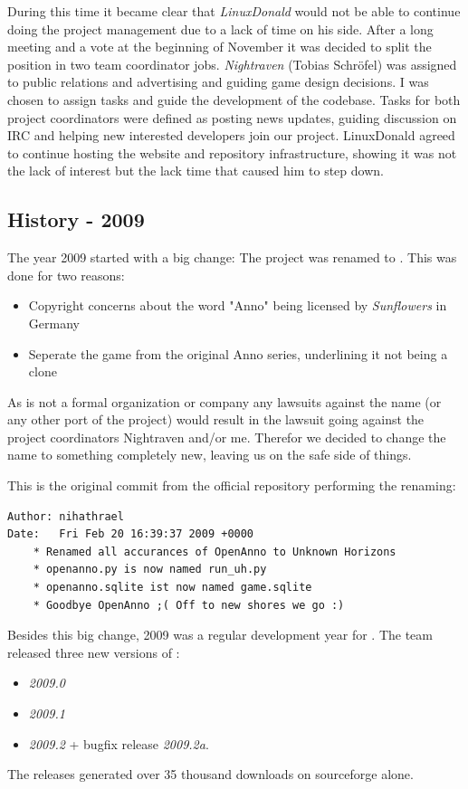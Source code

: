 During this time it became clear that \textit{LinuxDonald} would not be able to continue doing the project management
due to a lack of time on his side. After a long meeting and a vote at the beginning of November it was decided to split the
position in two team coordinator jobs. \textit{Nightraven} (Tobias Schröfel) was assigned to public relations and
advertising and guiding game design decisions. I was chosen to assign tasks and guide the development of the codebase.
Tasks for both project coordinators were defined as posting news updates, guiding discussion on IRC and helping new
interested developers join our project. LinuxDonald agreed to continue hosting the website and repository
infrastructure, showing it was not the lack of interest but the lack time that caused him to step down.

\subsection{History - 2009}
The year 2009 started with a big change: The project was renamed to \UH{}. This was done for two reasons:
\begin{itemize}
    \item Copyright concerns about the word "Anno" being licensed by \textit{Sunflowers} in Germany
    \item Seperate the game from the original Anno series, underlining it not being a clone
\end{itemize}

As \UH{} is not a formal organization or company any lawsuits against the name (or any other port of the project) would
result in the lawsuit going against the project coordinators Nightraven and/or me. Therefor we decided to change the name to
something completely new, leaving us on the safe side of things.

This is the original commit from the official repository performing the renaming:
\begin{lstlisting}[caption=Commit 1831 renaming OpenAnno to Unknown Horizons, label=renamecommit]
Author: nihathrael
Date:   Fri Feb 20 16:39:37 2009 +0000
    * Renamed all accurances of OpenAnno to Unknown Horizons
    * openanno.py is now named run_uh.py
    * openanno.sqlite ist now named game.sqlite
    * Goodbye OpenAnno ;( Off to new shores we go :)
\end{lstlisting}

Besides this big change, 2009 was a regular development year for \UH{}. The team released three new versions of \UH{}:
\begin{itemize}
\item \textit{2009.0}
\item \textit{2009.1}
\item \textit{2009.2} + bugfix release \textit{2009.2a}. 
\end{itemize}
The releases generated over 35 thousand downloads on sourceforge alone.


